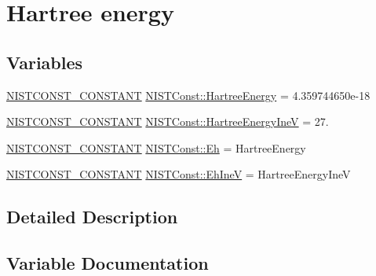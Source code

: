 \hypertarget{group___n_i_s_t_const-_hartree_energy}{}\section{Hartree energy}
\label{group___n_i_s_t_const-_hartree_energy}
\subsection*{Variables}
\begin{DoxyCompactItemize}
\item 
\mbox{\hyperlink{group___n_i_s_t_const-_macros_ga2b0fc1d7452373f816175dd86ce26729}{N\+I\+S\+T\+C\+O\+N\+S\+T\+\_\+\+C\+O\+N\+S\+T\+A\+NT}} \mbox{\hyperlink{group___n_i_s_t_const-_hartree_energy_ga07857f3a1e5865454cf529241763954f}{N\+I\+S\+T\+Const\+::\+Hartree\+Energy}} = 4.\+359744650e-\/18
\item 
\mbox{\hyperlink{group___n_i_s_t_const-_macros_ga2b0fc1d7452373f816175dd86ce26729}{N\+I\+S\+T\+C\+O\+N\+S\+T\+\_\+\+C\+O\+N\+S\+T\+A\+NT}} \mbox{\hyperlink{group___n_i_s_t_const-_hartree_energy_ga1b1d1cd8f70b3b70ad1e4a3347aac2ae}{N\+I\+S\+T\+Const\+::\+Hartree\+Energy\+IneV}} = 27.
\item 
\mbox{\hyperlink{group___n_i_s_t_const-_macros_ga2b0fc1d7452373f816175dd86ce26729}{N\+I\+S\+T\+C\+O\+N\+S\+T\+\_\+\+C\+O\+N\+S\+T\+A\+NT}} \mbox{\hyperlink{group___n_i_s_t_const-_hartree_energy_gad2bdc0eeae9003048c81f29e5ce4c319}{N\+I\+S\+T\+Const\+::\+Eh}} = Hartree\+Energy
\item 
\mbox{\hyperlink{group___n_i_s_t_const-_macros_ga2b0fc1d7452373f816175dd86ce26729}{N\+I\+S\+T\+C\+O\+N\+S\+T\+\_\+\+C\+O\+N\+S\+T\+A\+NT}} \mbox{\hyperlink{group___n_i_s_t_const-_hartree_energy_gaca634681543c1987792567e60836c133}{N\+I\+S\+T\+Const\+::\+Eh\+IneV}} = Hartree\+Energy\+IneV
\end{DoxyCompactItemize}


\subsection{Detailed Description}


\subsection{Variable Documentation}
\mbox{\label{group___n_i_s_t_const-_hartree_energy_gad2bdc0eeae9003048c81f29e5ce4c319}} 
